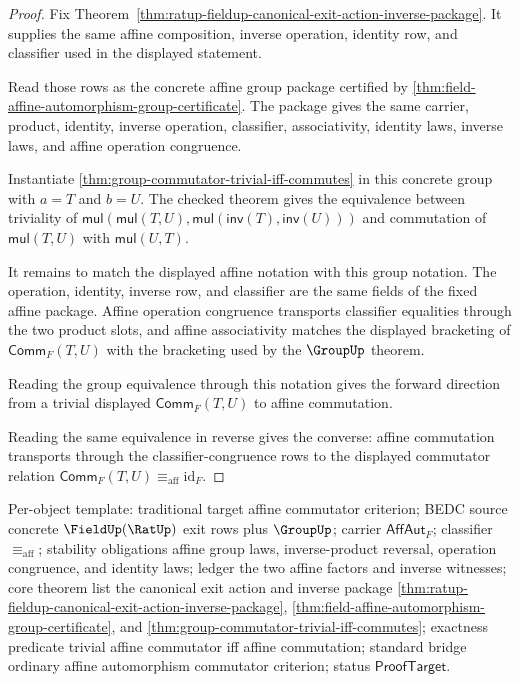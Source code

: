 \begin{proof}
Fix Theorem~\ref{thm:ratup-fieldup-canonical-exit-action-inverse-package}.
It supplies the same affine composition, inverse operation, identity row, and
classifier used in the displayed statement.

Read those rows as the concrete affine group package certified by
\autoref{thm:field-affine-automorphism-group-certificate}. The package gives
the same carrier, product, identity, inverse operation, classifier,
associativity, identity laws, inverse laws, and affine operation congruence.

Instantiate
\autoref{thm:group-commutator-trivial-iff-commutes} in this concrete group
with $a=T$ and $b=U$. The checked theorem gives the equivalence between
triviality of
$\mathsf{mul}(\mathsf{mul}(T,U),
\mathsf{mul}(\mathsf{inv}(T),\mathsf{inv}(U)))$ and commutation of
$\mathsf{mul}(T,U)$ with $\mathsf{mul}(U,T)$.

It remains to match the displayed affine notation with this group notation.
The operation, identity, inverse row, and classifier are the same fields of
the fixed affine package. Affine operation congruence transports classifier
equalities through the two product slots, and affine associativity matches
the displayed bracketing of $\mathsf{Comm}_F(T,U)$ with the bracketing used by
the $\GroupUp$ theorem.

Reading the group equivalence through this notation gives the forward
direction from a trivial displayed $\mathsf{Comm}_F(T,U)$ to affine
commutation.

Reading the same equivalence in reverse gives the converse: affine
commutation transports through the classifier-congruence rows to the displayed
commutator relation
$\mathsf{Comm}_F(T,U)\equiv_{\mathrm{aff}}\mathrm{id}_F$.
\end{proof}

Per-object template: traditional target affine commutator criterion; BEDC
source concrete $\FieldUp(\RatUp)$ exit rows plus $\GroupUp$; carrier
$\mathsf{AffAut}_F$; classifier $\equiv_{\mathrm{aff}}$; stability obligations
affine group laws, inverse-product reversal, operation congruence, and
identity laws; ledger the two affine factors and inverse witnesses; core
theorem list the canonical exit action and inverse package
\autoref{thm:ratup-fieldup-canonical-exit-action-inverse-package},
\autoref{thm:field-affine-automorphism-group-certificate}, and
\autoref{thm:group-commutator-trivial-iff-commutes}; exactness predicate
trivial affine commutator iff affine commutation; standard bridge ordinary
affine automorphism commutator criterion; status $\mathsf{ProofTarget}$.


